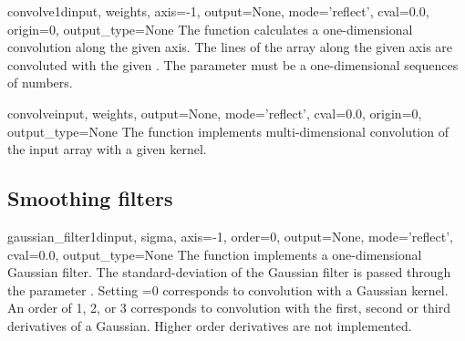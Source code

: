 \begin{funcdesc}{convolve1d}{input, weights, axis=-1, output=None, 
    mode='reflect', cval=0.0, origin=0, output_type=None} The
   function calculates a one-dimensional convolution 
  along the given axis. The lines of the array along the given axis are 
  convoluted with the given . The  parameter must 
  be a one-dimensional sequences of numbers.
  
\end{funcdesc}

\begin{funcdesc}{convolve}{input, weights, output=None, mode='reflect', 
    cval=0.0, origin=0, output_type=None} The function 
  implements multi-dimensional convolution of the input array with a given
  kernel.
  
\end{funcdesc}

\subsection{Smoothing filters}
\label{sec:ndimage:filter-functions:smoothing}

\begin{funcdesc}{gaussian_filter1d}{input, sigma, axis=-1, order=0, 
    output=None, mode='reflect', cval=0.0, output_type=None} The
   function implements a one-dimensional 
  Gaussian
  filter. The standard-deviation of the Gaussian filter is passed through 
  the parameter . Setting =0 corresponds to 
  convolution with a Gaussian kernel.  An order of 1, 2, or 3 corresponds 
  to convolution with the first, second or third derivatives of a Gaussian. 
  Higher order derivatives are not implemented.
\end{funcdesc}


